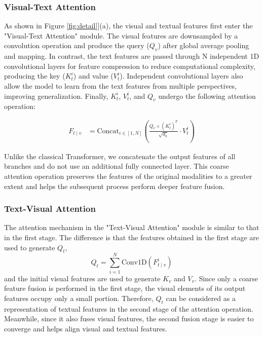 \subsubsection{Visual-Text Attention}

As shown in Figure \ref{fig:detail}](a), the visual and textual features first enter the "Visual-Text Attention" module. The visual features are downsampled by a convolution operation and produce the query ($Q_{v}$) after global average pooling and mapping. In contrast, the text features are passed through N independent 1D convolutional layers for feature compression to reduce computational complexity, producing the key ($K_{t}^{i}$) and value ($V_{t}^{i}$). Independent convolutional layers also allow the model to learn from the text features from multiple perspectives, improving generalization. Finally, $K_{t}^{i}$, $V_{t}^{i}$, and $Q_{v}$ undergo the following attention operation:

\begin{align}
F_{t \mid v} &= \text{Concat}_{i\in \left [ 1, N \right ] }\left ( \frac{Q_{v} \times \left ( K_{t}^{i} \right ) ^{T}}{\sqrt{d_{k}} } \cdot V_{t}^{i} \right ) 
\end{align}

Unlike the classical Transformer\citep{a-vaswani2017attention}, we concatenate the output features of all branches and do not use an additional fully connected layer. This coarse attention operation preserves the features of the original modalities to a greater extent and helps the subsequent process perform deeper feature fusion.

\subsubsection{Text-Visual Attention}

The attention mechanism in the "Text-Visual Attention" module is similar to that in the first stage. The difference is that the features obtained in the first stage are used to generate $Q_{t}$, $$Q_{t} = \sum_{i= 1}^{N} \text{Conv1D}(F_{t \mid v}^{i})$$ and the initial visual features are used to generate $K_{v}$ and $V_{v}$. Since only a coarse feature fusion is performed in the first stage, the visual elements of its output features occupy only a small portion. Therefore, $Q_{t}$ can be considered as a representation of textual features in the second stage of the attention operation. Meanwhile, since it also fuses visual features, the second fusion stage is easier to converge and helps align visual and textual features.

